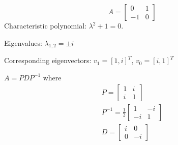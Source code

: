 \documentclass{homework}
\begin{document}
\begin{letterenum}
    \item 
    \begin{equation}
        A = \begin{bmatrix}
            0 & 1 \\ -1 & 0
        \end{bmatrix}
    \end{equation}
    Characteristic polynomial: $\lambda^2 + 1 = 0$.

    Eigenvalues: $\lambda_{1,2} = \pm i$

    Corresponding eigenvectors: $v_1 = [1, i]^T$, $v_0 = [i, 1]^T$

    $A = PDP^{-1}$ where
    \begin{align}
        P = \begin{bmatrix}
            1 & i \\ i & 1
        \end{bmatrix} \\
        P^{-1} = \frac{1}{2} \begin{bmatrix}
            1 & -i \\ -i & 1
        \end{bmatrix} \\
        D = \begin{bmatrix}
            i & 0 \\ 0 & -i
        \end{bmatrix} \\
    \end{align}


\end{letterenum}
\end{document}
